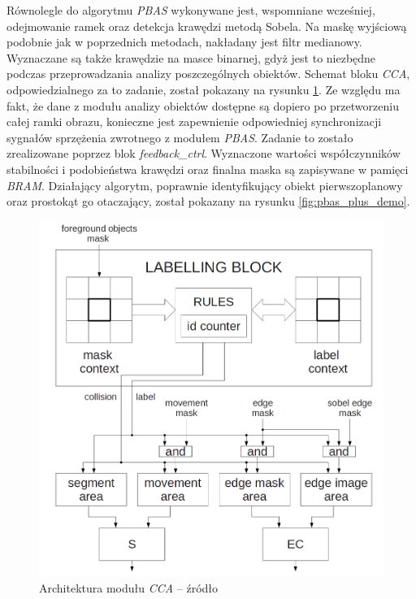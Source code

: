Równolegle do algorytmu \textit{PBAS} wykonywane jest, wspomniane wcześniej, odejmowanie ramek oraz detekcja krawędzi metodą Sobela. Na maskę wyjściową podobnie jak w poprzednich metodach, nakładany jest filtr medianowy. Wyznaczane są także krawędzie na masce binarnej, gdyż jest to niezbędne podczas przeprowadzania analizy poszczególnych obiektów. Schemat bloku \textit{CCA}, odpowiedzialnego za to zadanie, został pokazany na rysunku \ref{fig:cca_diagram}. Ze względu ma fakt, że dane z modułu analizy obiektów dostępne są dopiero po przetworzeniu całej ramki obrazu, konieczne jest zapewnienie odpowiedniej synchronizacji sygnałów sprzężenia zwrotnego z modułem  \textit{PBAS}. Zadanie to zostało zrealizowane poprzez blok \textit{feedback\_ctrl}. Wyznaczone wartości współczynników stabilności i podobieństwa krawędzi oraz finalna maska są zapisywane w pamięci \textit{BRAM}. Działający algorytm, poprawnie identyfikujący obiekt pierwszoplanowy oraz prostokąt go otaczający, został pokazany na rysunku \ref{fig:pbas_plus_demo}.

	\begin{figure}[h!]
		\centering
		\includegraphics[scale=0.35]{img/4/cca_diagram.png}
		\caption{Architektura modułu \textit{CCA} -- źródło \cite{kryjak_14_pbas}}
		\label{fig:cca_diagram}
	\end{figure}

